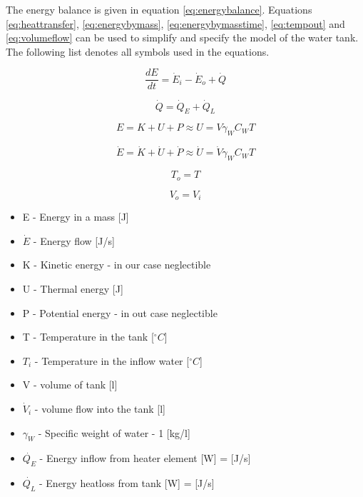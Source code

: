 \documentclass[11pt]{article} %
\begin{document}
The energy balance is given in equation \ref{eq:energybalance}. Equations \ref{eq:heattransfer}, \ref{eq:energybymass}, \ref{eq:energybymasstime}, \ref{eq:tempout} and \ref{eq:volumeflow} can be used to simplify and specify the model of the water tank. The following list denotes all symbols used in the equations.

\begin{equation} \label{eq:energybalance}
\frac{dE}{dt} = \dot{E}_i - \dot{E}_o + \dot{Q}
\end{equation}

\begin{equation} \label{eq:heattransfer}
\dot{Q} = \dot{Q}_E + \dot{Q}_L
\end{equation}

\begin{equation} \label{eq:energybymass}
E = K + U + P \approx U = V \gamma _W C_W T
\end{equation}

\begin{equation} \label{eq:energybymasstime}
\dot{E} = \dot{K} + \dot{U} + \dot{P} \approx \dot{U} = \dot{V} \gamma _W C_W T
\end{equation}

\begin{equation} \label{eq:tempout}
T_o = T
\end{equation}

\begin{equation} \label{eq:volumeflow}
V_o = V_i
\end{equation}


\begin{itemize}
	\item E - Energy in a mass [J]
	\item $\dot{E}$ - Energy flow [J/s]
	\item K - Kinetic energy - in our case neglectible
	\item U - Thermal energy [J]
	\item P - Potential energy - in out case neglectible
	\item T - Temperature in the tank [$^{\circ}C$]
	\item $T_i$ - Temperature in the inflow water [$^{\circ}C$]
	\item V - volume of tank [l]
	\item $ \dot{V} _i$ - volume flow into the tank [l]
	\item $\gamma _W$ - Specific weight of water - 1 [kg/l]
	\item $\dot{Q_E}$ - Energy inflow from heater element [W] = [J/s]
	\item $\dot{Q_L}$ - Energy heatloss from tank [W] = [J/s]
\end{itemize}
\end{document}
